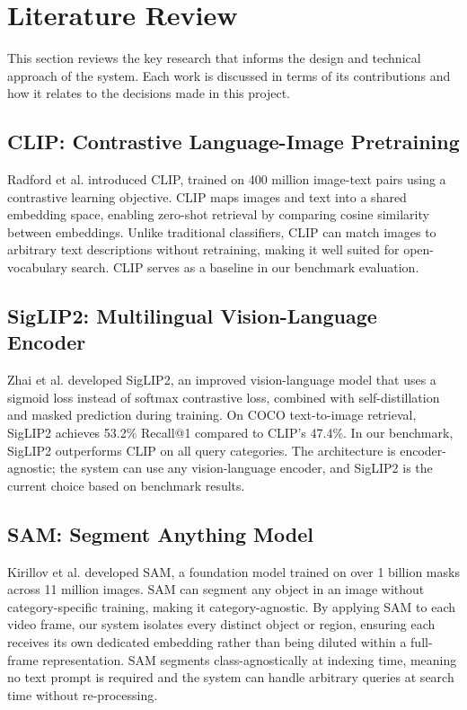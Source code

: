 \section{Literature Review}
\label{section:literature-review}

This section reviews the key research that informs the design and technical approach of the system. Each work is discussed in terms of its contributions and how it relates to the decisions made in this project.

\subsection{CLIP: Contrastive Language-Image Pretraining}

Radford et al. \cite{radford2021learning} introduced CLIP, trained on 400 million image-text pairs using a contrastive learning objective. CLIP maps images and text into a shared embedding space, enabling zero-shot retrieval by comparing cosine similarity between embeddings. Unlike traditional classifiers, CLIP can match images to arbitrary text descriptions without retraining, making it well suited for open-vocabulary search. CLIP serves as a baseline in our benchmark evaluation.

\subsection{SigLIP2: Multilingual Vision-Language Encoder}

Zhai et al. \cite{zhai2025siglip2} developed SigLIP2, an improved vision-language model that uses a sigmoid loss instead of softmax contrastive loss, combined with self-distillation and masked prediction during training. On COCO text-to-image retrieval, SigLIP2 achieves 53.2\% Recall@1 compared to CLIP's 47.4\%. In our benchmark, SigLIP2 outperforms CLIP on all query categories. The architecture is encoder-agnostic; the system can use any vision-language encoder, and SigLIP2 is the current choice based on benchmark results.

\subsection{SAM: Segment Anything Model}

Kirillov et al. \cite{kirillov2023segment} developed SAM, a foundation model trained on over 1 billion masks across 11 million images. SAM can segment any object in an image without category-specific training, making it category-agnostic. By applying SAM to each video frame, our system isolates every distinct object or region, ensuring each receives its own dedicated embedding rather than being diluted within a full-frame representation. SAM segments class-agnostically at indexing time, meaning no text prompt is required and the system can handle arbitrary queries at search time without re-processing.

